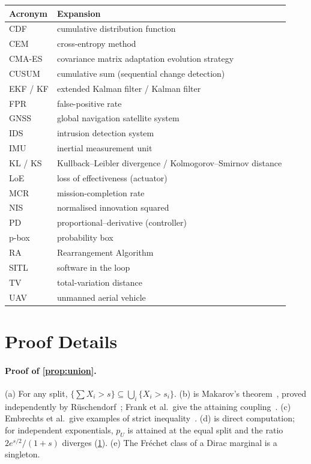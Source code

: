 \begin{center}
\vspace{4pt}
\begin{tabularx}{\columnwidth}{@{}l>{\raggedright\arraybackslash}X@{}}
\toprule
\textbf{Acronym} & \textbf{Expansion} \\
\midrule
CDF & cumulative distribution function \\
CEM & cross-entropy method \\
CMA-ES & covariance matrix adaptation evolution strategy \\
CUSUM & cumulative sum (sequential change detection) \\
EKF / KF & extended Kalman filter / Kalman filter \\
FPR & false-positive rate \\
GNSS & global navigation satellite system \\
IDS & intrusion detection system \\
IMU & inertial measurement unit \\
KL / KS & Kullback--Leibler divergence / Kolmogorov--Smirnov distance \\
LoE & loss of effectiveness (actuator) \\
MCR & mission-completion rate \\
NIS & normalised innovation squared \\
PD & proportional--derivative (controller) \\
p-box & probability box \\
RA & Rearrangement Algorithm \\
SITL & software in the loop \\
TV & total-variation distance \\
UAV & unmanned aerial vehicle \\
\bottomrule
\end{tabularx}
\end{center}

\section{Proof Details}
\label{app:proofs}
\paragraph{Proof of \cref{prop:union}.}
(a) For any split, $\{\sum X_i>s\}\subseteq\bigcup_i\{X_i>s_i\}$. (b) is
Makarov's theorem~\cite{makarov1981}, proved independently by
R\"uschendorf~\cite{ruschendorf1982}; Frank et al.\ give the
attaining coupling~\cite{frank1987}. (c) Embrechts et al.\ give examples of
strict inequality~\cite{embrechts2013var}. (d) is direct
computation; for independent exponentials, $p_U$ is attained at the equal split
and the ratio $2e^{s/2}/(1+s)$ diverges (\cref{app:proofs}). (e) The Fr\'echet
class of a Dirac marginal is a singleton.

